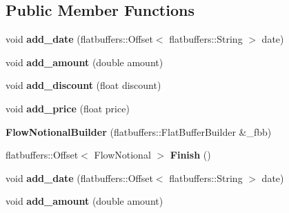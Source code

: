 \subsection*{Public Member Functions}
\begin{DoxyCompactItemize}
\item 
\mbox{\label{structquantra_1_1FlowNotionalBuilder_af2c9d1837a46ee7155a80324000e2283}} 
void {\bfseries add\+\_\+date} (flatbuffers\+::\+Offset$<$ flatbuffers\+::\+String $>$ date)
\item 
\mbox{\label{structquantra_1_1FlowNotionalBuilder_a150732d2e3ad6a520bd64420143c6c64}} 
void {\bfseries add\+\_\+amount} (double amount)
\item 
\mbox{\label{structquantra_1_1FlowNotionalBuilder_aa6d366144beedef59f12e9db505252b2}} 
void {\bfseries add\+\_\+discount} (float discount)
\item 
\mbox{\label{structquantra_1_1FlowNotionalBuilder_ae55cbbf2db93d750eba52851fafa25f8}} 
void {\bfseries add\+\_\+price} (float price)
\item 
\mbox{\label{structquantra_1_1FlowNotionalBuilder_ac04619c2ce3d2c95a1dcadbe916749f0}} 
{\bfseries Flow\+Notional\+Builder} (flatbuffers\+::\+Flat\+Buffer\+Builder \&\+\_\+fbb)
\item 
\mbox{\label{structquantra_1_1FlowNotionalBuilder_a09e89f044a3682c6ef99b98776083cb9}} 
flatbuffers\+::\+Offset$<$ Flow\+Notional $>$ {\bfseries Finish} ()
\item 
\mbox{\label{structquantra_1_1FlowNotionalBuilder_af2c9d1837a46ee7155a80324000e2283}} 
void {\bfseries add\+\_\+date} (flatbuffers\+::\+Offset$<$ flatbuffers\+::\+String $>$ date)
\item 
\mbox{\label{structquantra_1_1FlowNotionalBuilder_a150732d2e3ad6a520bd64420143c6c64}} 
void {\bfseries add\+\_\+amount} (double amount)
\item 
\mbox{\label{structquantra_1_1FlowNotionalBuilder_aa6d366144beedef59f12e9db505252b2}} 

\end{DoxyCompactItemize}
